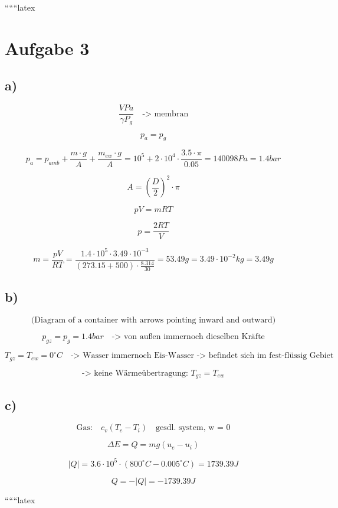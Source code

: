 
``````latex


\section*{Aufgabe 3}

\subsection*{a)}

\[
\frac{VPa}{\gamma P_{g}} \quad \text{-> membran}
\]

\[
p_a = p_g
\]

\[
p_a = p_{amb} + \frac{m \cdot g}{A} + \frac{m_{ew} \cdot g}{A} = 10^5 + 2 \cdot 10^4 \cdot \frac{3.5 \cdot \pi}{0.05} = 140098 Pa = 1.4 bar
\]

\[
A = \left(\frac{D}{2}\right)^2 \cdot \pi
\]

\[
pV = mRT
\]

\[
p = \frac{2RT}{V}
\]

\[
m = \frac{pV}{RT} = \frac{1.4 \cdot 10^5 \cdot 3.49 \cdot 10^{-3}}{(273.15 + 500) \cdot \frac{8.314}{30}} = 53.49 g = 3.49 \cdot 10^{-2} kg = 3.49 g
\]

\subsection*{b)}

\[
\text{(Diagram of a container with arrows pointing inward and outward)}
\]

\[
p_{gz} = p_g = 1.4 bar \quad \text{-> von außen immernoch dieselben Kräfte}
\]

\[
T_{gz} = T_{ew} = 0^\circ C \quad \text{-> Wasser immernoch Eis-Wasser -> befindet sich im fest-flüssig Gebiet}
\]

\[
\text{-> keine Wärmeübertragung: } T_{gz} = T_{ew}
\]

\subsection*{c)}

\[
\text{Gas:} \quad c_v(T_e - T_i) \quad \text{gesdl. system, w = 0}
\]

\[
\Delta E = Q = m g (u_e - u_i)
\]

\[
|Q| = 3.6 \cdot 10^5 \cdot (800^\circ C - 0.005^\circ C) = 1739.39 J
\]

\[
Q = -|Q| = -1739.39 J
\]

``````latex


